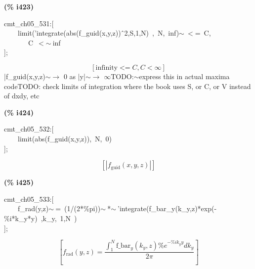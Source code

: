 \documentclass[fleqn]{article}
\begin{document}
\noindent
\begin{minipage}[t]{4.000000em}\color{red}\bfseries
(\% i423)	
\end{minipage}
\begin{minipage}[t]{\textwidth}\color{blue}
cmt\_ch05\_531:[\\
\ \ \ \ limit('integrate(abs(f\_guid(x,y,z))\^\ 2,S,1,N)\ ,\ N,\ inf)\ensuremath{\sim\ }\ensuremath{<}=\ C,\\
\ \ \ \ \ \ \ C\ \ensuremath{<}\ensuremath{\sim\ }inf\\
];\\

\end{minipage}
\[\displaystyle \tag{\% o423} 
\left[ \ensuremath{\mathrm{infinity}}\operatorname{<  =}C\operatorname{,}C\operatorname{<  }\infty \right] \mbox{}
\]
|f\_guid(x,y,z)\ensuremath{\sim }\ensuremath{\longrightarrow} 0 as |y|\ensuremath{\sim }\ensuremath{\longrightarrow} \ensuremath{\infty}TODO:\ensuremath{\sim }express this in actual maxima codeTODO: check limits of integration where the book uses S, or C, or V instead of dxdy, etc


\noindent
\begin{minipage}[t]{4.000000em}\color{red}\bfseries
(\% i424)	
\end{minipage}
\begin{minipage}[t]{\textwidth}\color{blue}
cmt\_ch05\_532:[\\
\ \ \ \ limit(abs(f\_guid(x,y,z)),\ N,\ 0)\\
];
\end{minipage}
\[\displaystyle \tag{\% o424} 
\left[ \left| {f_{\ensuremath{\mathrm{guid}}}}\left( x\operatorname{,}y\operatorname{,}z\right) \right| \right] \mbox{}
\]


\noindent
\begin{minipage}[t]{4.000000em}\color{red}\bfseries
(\% i425)	
\end{minipage}
\begin{minipage}[t]{\textwidth}\color{blue}
cmt\_ch05\_533:[\\
\ \ \ \ f\_rad(y,z)\ensuremath{\sim\ }=\ (1/(2*\%pi))\ensuremath{\sim\ }*\ensuremath{\sim\ }'integrate(f\_bar\_y(k\_y,z)*exp(-\%i*k\_y*y)\ ,k\_y,\ 1,N\ )\\
];
\end{minipage}
\[\displaystyle \tag{\% o425} 
\left[ {f_{\ensuremath{\mathrm{rad}}}}\left( y\operatorname{,}z\right) =\frac{\int_{1}^{N}{\left. {{\ensuremath{\mathrm{f\_ bar}}}_y}\left( {k_y}\operatorname{,}z\right)  {{\% e}^{-\% i {k_y} y}}d{k_y}\right.}}{2 \ensuremath{\pi} }\right] \mbox{}
\]
\end{document}
